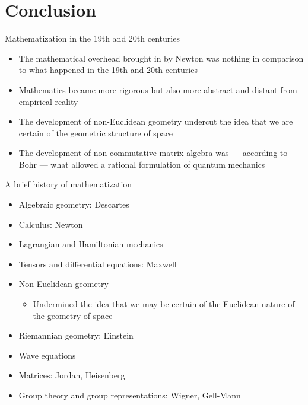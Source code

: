 \documentclass[fleqn]{beamer}
\begin{document}
\section{Conclusion}

\begin{frame}{Mathematization in the 19th and 20th centuries}

  \begin{itemize}
  \item The mathematical overhead brought in by Newton was nothing in
    comparison to what happened in the 19th and 20th centuries
  \item Mathematics became more rigorous but also more abstract and
    distant from empirical reality
  \item The development of non-Euclidean geometry undercut the idea
    that we are certain of the geometric structure of space
  \item The development of non-commutative matrix algebra was ---
    according to Bohr --- what allowed a rational formulation of
    quantum mechanics
  \end{itemize}

\end{frame}

\begin{frame}{A brief history of mathematization}

  \begin{itemize}
  \item Algebraic geometry: Descartes
  \item Calculus: Newton
  \item Lagrangian and Hamiltonian mechanics
  \item Tensors and differential equations: Maxwell
  \item Non-Euclidean geometry
    \begin{itemize}
    \item Undermined the idea that we may be certain of the Euclidean
      nature of the geometry of space
    \end{itemize}
  \item Riemannian geometry: Einstein
  \item Wave equations
  \item Matrices: Jordan, Heisenberg
  \item Group theory and group representations: Wigner, Gell-Mann
  \end{itemize}

\end{frame}
\end{document}
